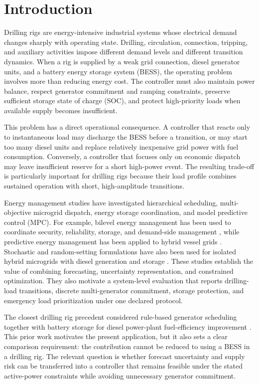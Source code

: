 \section{Introduction}\label{introduction}

Drilling rigs are energy-intensive industrial systems whose electrical
demand changes sharply with operating state. Drilling, circulation,
connection, tripping, and auxiliary activities impose different demand
levels and different transition dynamics. When a rig is supplied by a
weak grid connection, diesel generator units, and a battery energy
storage system (BESS), the operating problem involves more than reducing
energy cost. The controller must also maintain power balance, respect
generator commitment and ramping constraints, preserve sufficient
storage state of charge (SOC), and protect high-priority loads when
available supply becomes insufficient.

This problem has a direct operational consequence. A controller that
reacts only to instantaneous load may discharge the BESS before a
transition, or may start too many diesel units and replace relatively
inexpensive grid power with fuel consumption. Conversely, a controller
that focuses only on economic dispatch may leave insufficient reserve
for a short high-power event. The resulting trade-off is particularly
important for drilling rigs because their load profile combines
sustained operation with short, high-amplitude transitions.

Energy management studies have investigated hierarchical scheduling,
multi-objective microgrid dispatch, energy storage coordination, and
model predictive control (MPC). For example, bilevel energy management
has been used to coordinate security, reliability, storage, and
demand-side management
\citep{jokar2022bilevel},
while predictive energy management has been applied to hybrid vessel
grids \citep{vafamand2020predictive}. Stochastic and random-setting formulations have also been used
for isolated hybrid microgrids with diesel generation and storage
\citep{vergine2022optimal}.
These studies establish the value of combining forecasting, uncertainty
representation, and constrained optimization. They also motivate a
system-level evaluation that reports drilling-load transitions, discrete
multi-generator commitment, storage protection, and emergency load
prioritization under one declared protocol.

The closest drilling rig precedent considered rule-based generator
scheduling together with battery storage for diesel power-plant
fuel-efficiency improvement
\citep{pavkovic2016oil}. This prior work motivates the present application, but it also
sets a clear comparison requirement: the contribution cannot be reduced
to using a BESS in a drilling rig. The relevant question is whether
forecast uncertainty and supply risk can be transferred into a
controller that remains feasible under the stated active-power constraints while avoiding unnecessary
generator commitment.

